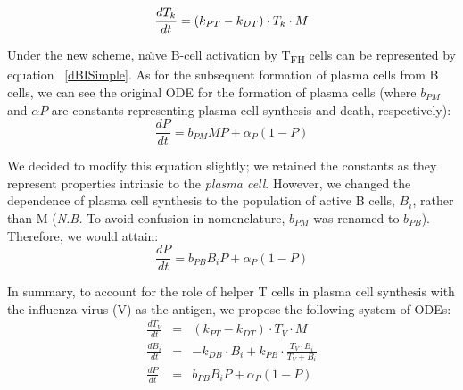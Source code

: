 \documentclass[a4paper, 12pt]{report}
\begin{document}
\begin{equation}
\frac{dT_k}{dt} = (k_{PT}-k_{DT}) \cdot T_k \cdot M \\
\end{equation}

Under the new scheme, na\"\i ve B-cell activation by T\textsubscript{FH} cells can be represented by equation ~\ref{dBISimple}. As for the subsequent formation of plasma cells from B cells, we can see the original ODE for the formation of plasma cells (where $b_{PM}$ and $\alpha{P}$ are constants representing plasma cell synthesis and death, respectively):
\begin{equation}
\frac{dP}{dt} = b_{PM}MP + \alpha_{P}(1 - P)
\end{equation}

We decided to modify this equation slightly; we retained the constants as they represent properties intrinsic to the \emph{plasma cell}. However, we changed the dependence of plasma cell synthesis to the population of active B cells, $B_{i}$, rather than M (\emph{N.B. }To avoid confusion in nomenclature, $b_{PM}$ was renamed to $b_{PB}$). Therefore, we would attain:
\begin{equation}
\frac{dP}{dt} = b_{PB}B_{i}P + \alpha_{P}(1 - P)
\end{equation}

In summary, to account for the role of helper T cells in plasma cell synthesis with the influenza virus (V) as the antigen, we propose the following system of ODEs:
\begin{eqnarray*}
\frac{dT_V}{dt} &=& (k_{PT}-k_{DT}) \cdot T_V \cdot M \\
\frac{dB_i}{dt} &=& -k_{DB} \cdot B_i + k_{PB} \cdot \frac{T_{V} \cdot B_{i}}{T_{V}+B_{i}} \\
\frac{dP}{dt} &=& b_{PB}B_{i}P + \alpha_{P}(1 - P)
\end{eqnarray*}
\end{document}
